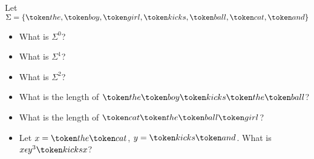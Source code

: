  Let $\Sigma = \{ \tokthe, \tokboy, \tokgirl, \tokkicks, \tokball, \tokcat, \tokand \}$
 \begin{itemize}
  \item What is $\Sigma^0$?
  \item What is $\Sigma^1$?
  \item What is $\Sigma^2$?
  \item What is the length of $\tokthe \tokboy \tokkicks \tokthe \tokball$?
  \item What is the length of $\tokcat \tokthe \tokball \tokgirl$?
  \item Let $x = \tokthe\tokcat$, $y=\tokkicks\tokand$. What is $x\epsilon
  y^3\tokkicks x$?
 \end{itemize}
